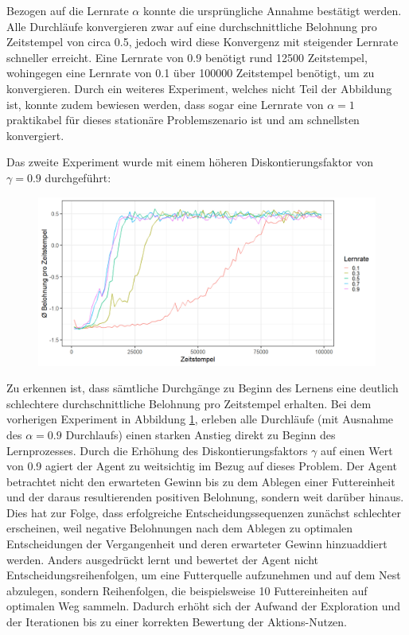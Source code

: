 \newpage
Bezogen auf die Lernrate $\alpha$ konnte die ursprüngliche Annahme bestätigt werden. Alle Durchläufe konvergieren zwar auf eine durchschnittliche Belohnung pro Zeitstempel von circa 0.5, jedoch wird diese Konvergenz mit steigender Lernrate schneller erreicht. Eine Lernrate von 0.9 benötigt rund 12500 Zeitstempel, wohingegen eine Lernrate von 0.1 über 100000 Zeitstempel benötigt, um zu konvergieren. Durch ein weiteres Experiment, welches nicht Teil der Abbildung ist, konnte zudem bewiesen werden, dass sogar eine Lernrate von $\alpha = 1$ praktikabel für dieses stationäre Problemszenario ist und am schnellsten konvergiert.
\par 
Das zweite Experiment wurde mit einem höheren Diskontierungsfaktor von $\gamma=0.9$ durchgeführt:
\begin{figure}[H]
    \centering
    \includegraphics[width=\textwidth]{images/antGameAnalysis09DiscA}
    \label{fig:gamma09}
\end{figure}
Zu erkennen ist, dass sämtliche Durchgänge zu Beginn des Lernens eine deutlich schlechtere durchschnittliche Belohnung pro Zeitstempel erhalten. Bei dem vorherigen Experiment in Abbildung \ref{fig:gamma09}, erleben alle Durchläufe (mit Ausnahme des $\alpha = 0.9$ Durchlaufs) einen starken Anstieg direkt zu Beginn des Lernprozesses. Durch die Erhöhung des Diskontierungsfaktors $\gamma$ auf einen Wert von 0.9 agiert der Agent zu weitsichtig im Bezug auf dieses Problem. Der Agent betrachtet nicht den erwarteten Gewinn bis zu dem Ablegen einer Futtereinheit und der daraus resultierenden positiven Belohnung, sondern weit darüber hinaus. Dies hat zur Folge, dass erfolgreiche Entscheidungssequenzen zunächst schlechter erscheinen, weil negative Belohnungen nach dem Ablegen zu optimalen Entscheidungen der Vergangenheit und deren erwarteter Gewinn hinzuaddiert werden. Anders ausgedrückt lernt und bewertet der Agent nicht Entscheidungsreihenfolgen, um eine Futterquelle aufzunehmen und auf dem Nest abzulegen, sondern Reihenfolgen, die beispielsweise 10 Futtereinheiten auf optimalen Weg sammeln. Dadurch erhöht sich der Aufwand der Exploration und der Iterationen bis zu einer korrekten Bewertung der Aktions-Nutzen.
